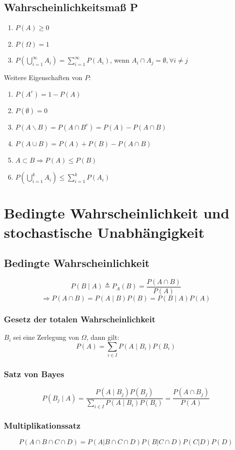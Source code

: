 \documentclass[a4paper,twocolumn,10pt]{article}
\newenvironment{iii}{\begin{enumerate}[label={\roman{*})}]}{\end{enumerate}}
\begin{document}
\subsection{Wahrscheinlichkeitsmaß P}
\begin{iii}
\item $P(A) \geq 0$
\item $P(\Omega) = 1$
\item $P(\bigcup_{i=1}^\infty A_i) = \sum_{i=1}^\infty P(A_i)$, wenn $A_i \cap A_j = \emptyset, \forall i \neq j$
\end{iii}
Weitere Eigenschaften von $P$:
\begin{iii}
\item $P(A^c) = 1 - P(A)$
\item $P(\emptyset) = 0$
\item $P(A \backslash B) = P(A \cap B^c) = P(A) - P(A \cap B)$
\item $P(A \cup B) = P(A) + P (B) - P(A \cap B)$
\item $A \subset B \Rightarrow P(A) \leq P(B)$
\item $P(\bigcup_{i=1}^k A_i) \leq \sum_{i=1}^k P(A_i)$
\end{iii}

\section{Bedingte Wahrscheinlichkeit und stochastische Unabhängigkeit}
\subsection{Bedingte Wahrscheinlichkeit}
\[P(B \mid A) \triangleq P_A(B) = \frac{P(A \cap B)}{P(A)}\]
\[\Rightarrow P(A \cap B) = P(A \mid B)P(B) = P(B \mid A)P(A) \]

\subsubsection{Gesetz der totalen Wahrscheinlichkeit}
$B_i$ sei eine Zerlegung von $\Omega$, dann gilt:
\[P(A) = \sum_{i \in I} P(A \mid B_i)P(B_i)\]

\subsubsection{Satz von Bayes}
\[P(B_j \mid A) = \frac{P(A \mid B_j)P(B_j)}{\sum_{i \in I} P(A \mid B_i)P(B_i)}=\frac{P(A\cap B_j)}{P(A)}\]

\subsubsection{Multiplikationssatz}
\[P(A\cap B\cap C\cap D)=P(A|B\cap C\cap D)P(B|C\cap D)P(C|D)P(D) \]
\end{document}
